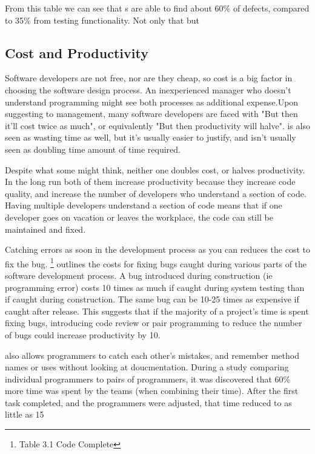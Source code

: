 \documentclass{article}
\begin{document}
From this table we can see that \CR s are able to find about 60\% of defects, compared to 35\% from testing functionality. Not only that but \CR

\subsection{Cost and Productivity}

Software developers are not free, nor are they cheap, so cost is a big factor in choosing the software design process. An inexperienced manager who doesn't understand programming might see both processes as additional expense.Upon suggesting \PP to management, many software developers are faced with "But then it'll cost twice as much", or equivalently "But then productivity will halve". \CR is also seen as wasting time as well, but it's usually easier to justify, and isn't usually seen as doubling time amount of time required.

Despite what some might think, neither one doubles cost, or halves productivity. In the long run both of them increase productivity because they increase code quality, and increase the number of developers who understand a section of code. Having multiple developers understand a section of code means that if one developer goes on vacation or leaves the workplace, the code can still be maintained and fixed.

Catching errors as soon in the development process as you can reduces the cost to fix the bug. \cite{avgCostOfDefect}\footnote{Table 3.1 Code Complete} outlines the costs for fixing bugs caught during various parts of the software development process. A bug introduced during construction (ie programming error) costs 10 times as much if caught during system testing than if caught during construction. The same bug can be 10-25 times as expensive if caught after release. This suggests that if the majority of a project's time is spent fixing bugs, introducing code review or pair programming to reduce the number of bugs could increase productivity by 10.

\PP also allows programmers to catch each other's mistakes, and remember method names or uses without looking at doucmentation. During a study comparing individual programmers to pairs of programmers, it was discovered that 60\% more time was spent by the teams (when combining their time). After the first task completed, and the programmers were adjusted, that time reduced to as little as 15%
\end{document}
